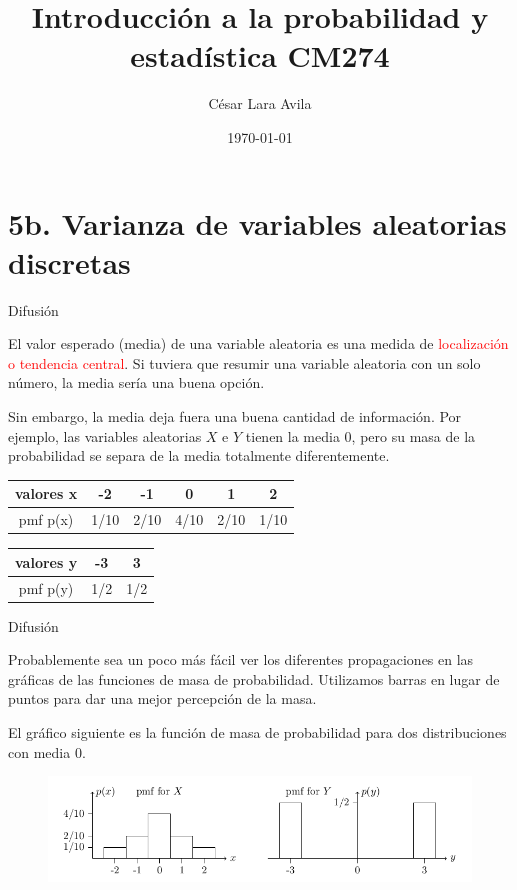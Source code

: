 \documentclass[10pt]{beamer}
\title{Introducci\'on a la probabilidad y estad\'istica CM274}
\date{\today}
\author{C\'esar Lara Avila}
\institute{\url{https://github.com/C-Lara}}
\begin{document}
  \maketitle
  \section{5b. Varianza  de variables aleatorias discretas }
  
\begin{frame}{Difusi\'on}

\small {El valor esperado (media) de una variable aleatoria es una medida de \textcolor{red}{localizaci\'on o tendencia central}. Si tuviera que resumir una variable aleatoria con un solo n\'umero, la media ser\'ia una buena opci\'on. 

Sin embargo, la media deja fuera una buena cantidad de informaci\'on. Por ejemplo, las variables aleatorias $X$ e $Y$ tienen la media $0$, pero su masa de la probabilidad se separa de la media totalmente diferentemente.}

\vspace{0.3cm}


\begin{table}[]
	\centering
	\begin{tabular}{c|ccccc}
		valores  x & -2   & -1   & 0    & 1    & 2   \\
		\hline
		pmf p(x)   & 1/10 & 2/10 & 4/10 & 2/10 & 1/10
	\end{tabular}
\end{table} \begin{table}[]
	\centering
	\begin{tabular}{c|cc}
		valores  y & -3  & 3   \\
		\hline
		pmf p(y)   & 1/2 & 1/2
	\end{tabular}
\end{table}
\end{frame}
\begin{frame}{Difusi\'on}
\small {Probablemente sea un poco m\'as f\'acil ver los diferentes propagaciones  en las gr\'aficas de las funciones de masa de probabilidad. Utilizamos barras en lugar de puntos para dar una mejor percepci\'on de la masa. 
	
El gr\'afico siguiente es la funci\'on de masa de probabilidad para dos distribuciones con media $0$.

	
\begin{figure}[ht]
	\centering
	\includegraphics[scale=.4]{J1.png}
\end{figure}
	}
\end{frame}
\end{document}
